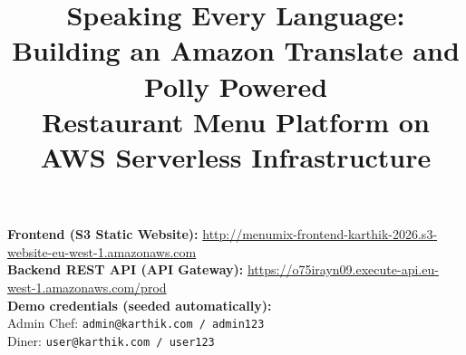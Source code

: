 \documentclass[conference]{IEEEtran}
\begin{document}
\title{Speaking Every Language: \\
Building an Amazon Translate and Polly Powered \\
Restaurant Menu Platform on AWS Serverless Infrastructure}

\author{
}

\maketitle

\begin{tcolorbox}[
    colback=orange!4,
    colframe=orange!50!black,
    title=\textbf{Deployed Application --- Live URLs},
    fonttitle=\small,
    fontupper=\footnotesize,
    left=4pt, right=4pt, top=3pt, bottom=3pt,
    arc=2pt
]
\textbf{Frontend (S3 Static Website):} \url{http://menumix-frontend-karthik-2026.s3-website-eu-west-1.amazonaws.com} \\[2pt]
\textbf{Backend REST API (API Gateway):} \url{https://o75irayn09.execute-api.eu-west-1.amazonaws.com/prod} \\[2pt]
\textbf{Demo credentials (seeded automatically):} \\
\quad Admin Chef: \texttt{admin@karthik.com / admin123} \\
\quad Diner: \texttt{user@karthik.com / user123}
\end{tcolorbox}
\end{document}
